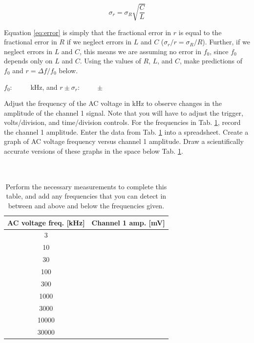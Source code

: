 \documentclass[12pt,twocolumn]{article}
\begin{document}
\begin{equation}
\sigma_r = \sigma_R \sqrt{\frac{C}{L}} \label{eq:error}
\end{equation}

Equation \ref{eq:error} is simply that the fractional error in $r$ is equal to the fractional error in $R$ if we neglect errors in $L$ and $C$ ($\sigma_r/r = \sigma_R/R$).  Further, if we neglect errors in $L$ and $C$, this means we are assuming no error in $f_0$, since $f_0$ depends only on $L$ and $C$.  Using the values of $R$, $L$, and $C$, make predictions of $f_0$ and $r = \Delta f/f_0$ below. \\ \vspace{0.5cm}

\underline{$f_0: ~~~~~~~~~~$} kHz, and \underline{$r \pm \sigma_r: ~~~~~~~~~~\pm~~~~~~~~~~$} \\ \vspace{0.5cm}

Adjust the frequency of the AC voltage in kHz to observe changes in the amplitude of the channel 1 signal.  Note that you will have to adjust the trigger, volts/division, and time/division controls.  For the frequencies in Tab. \ref{tab:data}, record the channel 1 amplitude.  Enter the data from Tab. \ref{tab:data} into a spreadsheet.  Create a graph of AC voltage frequency versus channel 1 amplitude.  Draw a scientifically accurate versions of these graphs in the space below Tab. \ref{tab:data}. \\ \\ \\

\begin{table}[ht]
\footnotesize
\begin{tabular}{| c | c |}
\hline
\textbf{AC voltage freq.} [kHz] & \textbf{Channel 1 amp.} [mV] \\ \hline
3 & \\ \hline
10 & \\ \hline
30 & \\ \hline
100 & \\ \hline
300 & \\ \hline
1000 & \\ \hline
3000 & \\ \hline
10000 & \\ \hline
30000 & \\ \hline
\end{tabular}
\caption{\label{tab:data} Perform the necessary measurements to complete this table, and add any frequencies that you can detect in between and above and below the frequencies given.}
\end{table}
\end{document}
